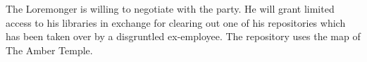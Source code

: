 The Loremonger is willing to negotiate with the party.
He will grant limited access to his libraries in exchange for clearing out one of his repositories which has been taken over by a disgruntled ex-employee.
The repository uses the map of The Amber Temple.
